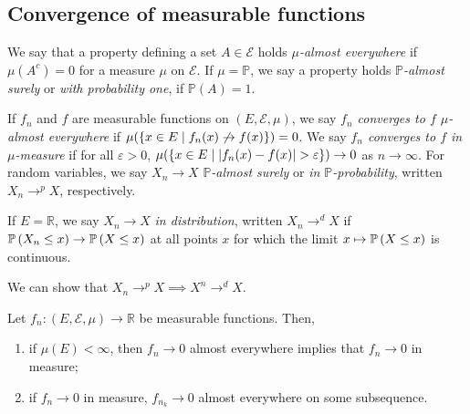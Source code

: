 \subsection{Convergence of measurable functions}
\begin{definition}
	We say that a property defining a set \( A \in \mathcal E \) holds \emph{\( \mu \)-almost everywhere} if \( \mu(A^c) = 0 \) for a measure \( \mu \) on \( \mathcal E \).
	If \( \mu = \mathbb P \), we say a property holds \emph{\( \mathbb P \)-almost surely} or \emph{with probability one}, if \( \mathbb P(A) = 1 \).

	If \( f_n \) and \( f \) are measurable functions on \( (E,\mathcal E,\mu) \), we say \emph{\( f_n \) converges to \( f \) \( \mu \)-almost everywhere} if \( \mu(\qty{x \in E \mid f_n(x) \not\to f(x)}) = 0 \).
	We say \emph{\( f_n \) converges to \( f \) in \( \mu \)-measure} if for all \( \varepsilon > 0 \), \( \mu(\qty{x\in E \mid \abs{f_n(x) - f(x)} > \varepsilon}) \to 0 \) as \( n \to \infty \).
	For random variables, we say \( X_n \to X \) \emph{\( \mathbb P \)-almost surely} or \emph{in \( \mathbb P \)-probability}, written \( X_n \to^p X \), respectively.

	If \( E = \mathbb R \), we say \( X_n \to X \) \emph{in distribution}, written \( X_n \to^d X \) if \( \mathbb{P}\left({X_n \leq x}\right) \to \mathbb{P}\left({X \leq x}\right) \) at all points \( x \) for which the limit \( x \mapsto \mathbb{P}\left({X \leq x}\right) \) is continuous.
\end{definition}
We can show that \( X_n \to^p X \implies X^n \to^d X \).
\begin{theorem}
	Let \( f_n \colon (E,\mathcal E,\mu) \to \mathbb R \) be measurable functions.
	Then,
	\begin{enumerate}
		\item if \( \mu(E) < \infty \), then \( f_n \to 0 \) almost everywhere implies that \( f_n \to 0 \) in measure;
		\item if \( f_n \to 0 \) in measure, \( f_{n_k} \to 0 \) almost everywhere on some subsequence.
	\end{enumerate}
\end{theorem}

